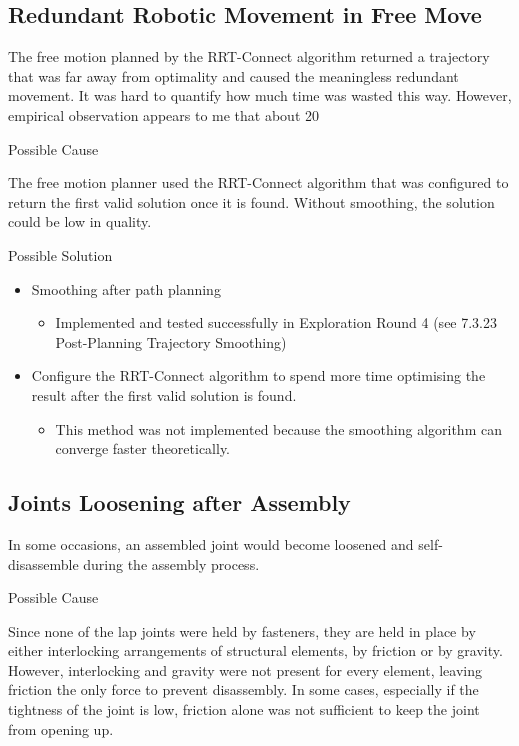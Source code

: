 \subsection{Redundant Robotic Movement in Free Move}
\label{subsection:exploration_2_redundant_robotic_movement_in_free_move}

The free motion planned by the RRT-Connect algorithm returned a trajectory that was far away from optimality and caused the meaningless redundant movement. It was hard to quantify how much time was wasted this way. However, empirical observation appears to me that about 20%

Possible Cause

The free motion planner used the RRT-Connect algorithm that was configured to return the first valid solution once it is found. Without smoothing, the solution could be low in quality.

Possible Solution
\begin{itemize}
    \item Smoothing after path planning
    \begin{itemize}
        \item Implemented and tested successfully in Exploration Round 4 (see 7.3.23 Post-Planning Trajectory Smoothing)
    \end{itemize}
    \item Configure the RRT-Connect algorithm to spend more time optimising the result after the first valid solution is found.
    \begin{itemize}
        \item This method was not implemented because the smoothing algorithm can converge faster theoretically.
    \end{itemize}
\end{itemize}

\subsection{Joints Loosening after Assembly}
\label{subsection:exploration_2_joints_loosening_after_assembly}

In some occasions, an assembled joint would become loosened and self-disassemble during the assembly process. 

Possible Cause

Since none of the lap joints were held by fasteners, they are held in place by either interlocking arrangements of structural elements, by friction or by gravity. However, interlocking and gravity were not present for every element, leaving friction the only force to prevent disassembly. In some cases, especially if the tightness of the joint is low, friction alone was not sufficient to keep the joint from opening up.

